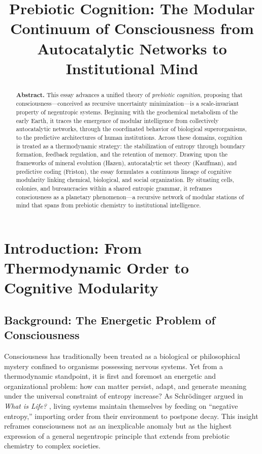 \documentclass[11pt,a4paper]{article}
\title{Prebiotic Cognition: The Modular Continuum of Consciousness from Autocatalytic Networks to Institutional Mind}
\author{}
\date{}
\begin{document}
\maketitle

\begin{abstract}
\noindent
\textbf{Abstract.} 
This essay advances a unified theory of \emph{prebiotic cognition}, proposing that consciousness---conceived as recursive uncertainty minimization---is a scale-invariant property of negentropic systems. 
Beginning with the geochemical metabolism of the early Earth, it traces the emergence of modular intelligence from collectively autocatalytic networks, through the coordinated behavior of biological superorganisms, to the predictive architectures of human institutions. 
Across these domains, cognition is treated as a thermodynamic strategy: the stabilization of entropy through boundary formation, feedback regulation, and the retention of memory. 
Drawing upon the frameworks of mineral evolution (Hazen), autocatalytic set theory (Kauffman), and predictive coding (Friston), the essay formulates a continuous lineage of cognitive modularity linking chemical, biological, and social organization. 
By situating cells, colonies, and bureaucracies within a shared entropic grammar, it reframes consciousness as a planetary phenomenon---a recursive network of modular stations of mind that spans from prebiotic chemistry to institutional intelligence.
\end{abstract}

\tableofcontents
\newpage


\section{Introduction: From Thermodynamic Order to Cognitive Modularity}
\label{sec:introduction}

\subsection{Background: The Energetic Problem of Consciousness}

Consciousness has traditionally been treated as a biological or philosophical mystery confined to organisms possessing nervous systems. Yet from a thermodynamic standpoint, it is first and foremost an energetic and organizational problem: how can matter persist, adapt, and generate meaning under the universal constraint of entropy increase?  As Schrödinger argued in \emph{What is Life?} \citep{Schrodinger1944WhatIsLife}, living systems maintain themselves by feeding on ``negative entropy,'' importing order from their environment to postpone decay.  This insight reframes consciousness not as an inexplicable anomaly but as the highest expression of a general negentropic principle that extends from prebiotic chemistry to complex societies.
\end{document}
